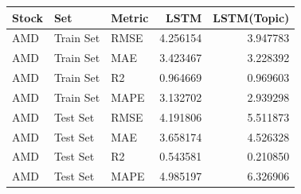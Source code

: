 \begin{tabular}{lllrr}
\toprule
Stock & Set & Metric & LSTM & LSTM(Topic) \\
\midrule
AMD & Train Set & RMSE & 4.256154 & 3.947783 \\
AMD & Train Set & MAE & 3.423467 & 3.228392 \\
AMD & Train Set & R2 & 0.964669 & 0.969603 \\
AMD & Train Set & MAPE & 3.132702 & 2.939298 \\
AMD & Test Set & RMSE & 4.191806 & 5.511873 \\
AMD & Test Set & MAE & 3.658174 & 4.526328 \\
AMD & Test Set & R2 & 0.543581 & 0.210850 \\
AMD & Test Set & MAPE & 4.985197 & 6.326906 \\
\bottomrule
\end{tabular}
